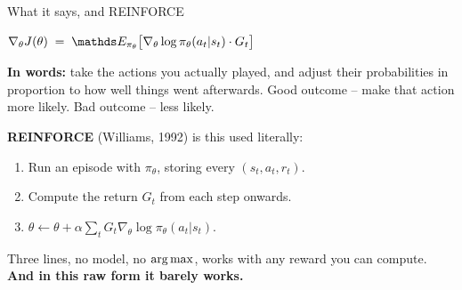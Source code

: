 \documentclass[aspectratio=169]{beamer}
\begin{document}
\begin{frame}{What it says, and REINFORCE}
  \begin{center}
    {\large $\nabla_\theta J(\theta) \;=\; \E_{\pi_\theta}\big[\nabla_\theta \log \pi_\theta(a_t|s_t) \cdot G_t\big]$}
  \end{center}

  \vskip 8pt
  \begin{tcolorbox}[colback=paramgreen!8, colframe=paramgreen, boxrule=0.6pt, arc=2pt]
    \textbf{In words:} take the actions you actually played, and adjust their probabilities in
    proportion to how well things went afterwards. Good outcome -- make that action more
    likely. Bad outcome -- less likely.
  \end{tcolorbox}

  \vskip 8pt
  \small
  \textbf{REINFORCE} (Williams, 1992) is this used literally:

  \vskip 3pt
  \begin{center}
  \begin{tcolorbox}[colback=lightbg, colframe=popblue, boxrule=0.6pt, arc=2pt, width=0.8\textwidth]
    \footnotesize
    \begin{enumerate}\itemsep1pt
      \item Run an episode with $\pi_\theta$, storing every $(s_t, a_t, r_t)$.
      \item Compute the return $G_t$ from each step onwards.
      \item $\theta \leftarrow \theta + \alpha \sum_t G_t \nabla_\theta \log \pi_\theta(a_t|s_t)$.
    \end{enumerate}
  \end{tcolorbox}
  \end{center}

  \vskip 6pt
  \begin{center}
    \small
    Three lines, no model, no $\mathop{\mathrm{arg\,max}}$, works with any reward you can compute.
    \textbf{And in this raw form it barely works.}
  \end{center}
\end{frame}
\end{document}
